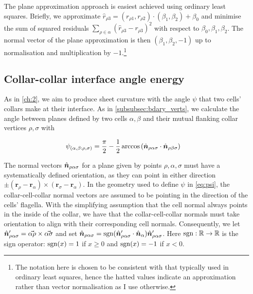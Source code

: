 The plane approximation approach is easiest achieved using ordinary least squares. 
Briefly, we approximate $\hat{r}_{\rho 3} = (r_{\rho 1}, r_{\rho 2}) \cdot (\beta_1, \beta_2) + \beta_0$ and minimise the sum of squared residuals $\sum_{\rho\in\alpha} (\hat{r}_{\rho 3} - r_{\rho 3})^2$ with respect to $\beta_0, \beta_1, \beta_2$. 
The normal vector of the plane approximation is then $(\beta_1, \beta_2, -1)$ up to normalisation and multiplication by $-1$.\footnote{The notation here is chosen to be consistent with that typically used in ordinary least squares, hence the hatted values indicate an approximation rather than vector normalisation as I use otherwise.} 

\subsection{Collar-collar interface angle energy} \label{subsec:e_psi}

As in \cref{ch:2}, we aim to produce sheet curvature with the angle $\psi$ that two cells' collars make at their interface. As in \cref{subsubsec:bdary_verts}, we calculate the angle between planes defined by two cells $\alpha, \beta$ and their mutual flanking collar vertices $\rho, \sigma$ with

\begin{align}
	\psi_{(\alpha, \beta: \rho, \sigma)} &= \frac{\pi}{2} - \frac{1}{2}\arccos \left(\hat{\bm{n}}_{\rho\alpha\sigma} \cdot \hat{\bm{n}}_{\rho\beta\sigma} \right) \label{eq:psi}
\end{align}

The normal vectors $\hat{\bm{n}}_{\rho\alpha\sigma}$ for a plane given by points $\rho, \alpha, \sigma$ must have a systematically defined orientation, as they can point in either direction $\pm (\bm{r}_\rho - \bm{r}_\alpha) \times (\bm{r}_\sigma - \bm{r}_\alpha)$. 
In the geometry used to define $\psi$ in \cref{eq:psi}, the collar-cell-collar normal vectors are assumed to be pointing in the direction of the cells' flagella. 
With the simplifying assumption that the cell normal always points in the inside of the collar, we have that the collar-cell-collar normals must take orientation to align with their corresponding cell normals. 
Consequently, we let $\hat{\bm{n}}_{\rho\alpha\sigma}' = \vec{\alpha\rho} \times \vec{\alpha\sigma}$ and set $\hat{\bm{n}}_{\rho\alpha\sigma} = \operatorname{sgn} (\hat{\bm{n}}_{\rho\alpha\sigma}' \cdot \hat{\bm{n}}_\alpha) \hat{\bm{n}}_{\rho\alpha\sigma}'$.
Here $\operatorname{sgn}: \mathbb{R} \to \mathbb{R}$ is the sign operator: $\operatorname{sgn}(x) = 1$ if $x \geq 0$ and $\operatorname{sgn}(x) = -1$ if $x < 0$.


